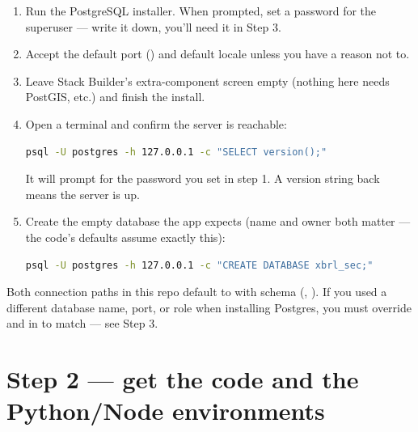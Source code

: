 \documentclass[11pt]{article}
\begin{document}
\begin{enumerate}
  \item Run the PostgreSQL installer. When prompted, set a password for the
         superuser --- write it down, you'll need it in Step 3.
  \item Accept the default port () and default locale unless you have a
        reason not to.
  \item Leave Stack Builder's extra-component screen empty (nothing here needs
        PostGIS, etc.) and finish the install.
  \item Open a terminal and confirm the server is reachable:
\begin{lstlisting}[language=bash]
psql -U postgres -h 127.0.0.1 -c "SELECT version();"
\end{lstlisting}
        It will prompt for the password you set in step 1. A version string back means
        the server is up.
  \item Create the empty database the app expects (name and owner both matter --- the
        code's defaults assume exactly this):
\begin{lstlisting}[language=bash]
psql -U postgres -h 127.0.0.1 -c "CREATE DATABASE xbrl_sec;"
\end{lstlisting}
\end{enumerate}

\begin{specbox}
\;
Both connection paths in this repo default to 
with schema  (, ).
If you used a different database name, port, or role when installing Postgres, you must
override  and  in  to match
--- see Step 3.
\end{specbox}

\section{Step 2 --- get the code and the Python/Node environments}
\end{document}
